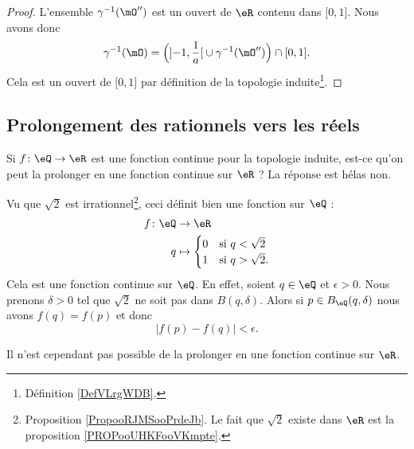 \begin{proof}
	L'ensemble \( \gamma^{-1}(\mO'')\) est un ouvert de \( \eR\) contenu dans \( \mathopen[ 0 , 1 \mathclose]\). Nous avons donc
	\begin{equation}
		\gamma^{-1}(\mO)=\Big( \mathopen] -1 , \frac{1}{ a } \mathclose[\cup\gamma^{-1}(\mO'') \Big)\cap \mathopen[ 0 , 1 \mathclose].
	\end{equation}
	Cela est un ouvert de \( \mathopen[ 0 , 1 \mathclose]\) par définition de la topologie induite\footnote{Définition \ref{DefVLrgWDB}.}.
\end{proof}

\subsection{Prolongement des rationnels vers les réels}

Si \( f\colon \eQ\to \eR\) est une fonction continue pour la topologie induite, est-ce qu'on peut la prolonger en une fonction continue sur \( \eR\) ? La réponse est hélas non.

\begin{example}       \label{EXooWZNCooQkKdtJ}
	Vu que \( \sqrt{ 2 }\) est irrationnel\footnote{Proposition \ref{PropooRJMSooPrdeJb}. Le fait que $\sqrt{ 2 }$ existe dans \( \eR\) est la proposition \ref{PROPooUHKFooVKmpte}.}, ceci définit bien une fonction sur \( \eQ\) :
	\begin{equation}
		\begin{aligned}
			f\colon \eQ & \to \eR                             \\
			q           & \mapsto \begin{cases}
				0 & \text{si } q<\sqrt{ 2 } \\
				1 & \text{si }q>\sqrt{ 2 }.
			\end{cases}
		\end{aligned}
	\end{equation}
	Cela est une fonction continue sur \( \eQ\). En effet, soient \( q\in \eQ\) et \( \epsilon>0\). Nous prenons \( \delta>0\) tel que \( \sqrt{ 2 }\) ne soit pas dans \( B(q,\delta)\). Alors si \( p\in B_{\eQ}(q,\delta)\) nous avons \( f(q)=f(p)\) et donc
	\begin{equation}
		| f(p)-f(q) |<\epsilon.
	\end{equation}

	Il n'est cependant pas possible de la prolonger en une fonction continue sur \( \eR\).
\end{example}

